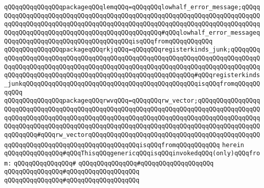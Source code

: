 \verb|qQQqqQQqqQQqqQQqpackageqQQqlemqQQq=qQQqqQQqlowhalf_error_message;qQQqqQQqqQQqqQQqqQQqqQQqqQQqqQQqqQQqqQQqqQQqqQQqqQQqqQQqqQQqqQQqqQQqqQQqqQQqqQQqqQQqqQQqqQQqqQQqqQQqqQQqqQQqqQQqqQQqqQQqqQQqqQQqqQQqqQQqqQQqqQQqqQQqqQQqqQQqqQQqqQQqqQQqqQQqqQQqqQQqqQQqqQQq#qQQqlowhalf_error_messageqQQqqQQqqQQqqQQqqQQqqQQqqQQqqQQqqQQqisqQQqfromqQQqqQQqqQQq|\newline
\verb|qQQqqQQqqQQqqQQqpackageqQQqrkjqQQq=qQQqqQQqregisterkinds_junk;qQQqqQQqqQQqqQQqqQQqqQQqqQQqqQQqqQQqqQQqqQQqqQQqqQQqqQQqqQQqqQQqqQQqqQQqqQQqqQQqqQQqqQQqqQQqqQQqqQQqqQQqqQQqqQQqqQQqqQQqqQQqqQQqqQQqqQQqqQQqqQQqqQQqqQQqqQQqqQQqqQQqqQQqqQQqqQQqqQQqqQQqqQQqqQQqqQQqqQQq#qQQqregisterkinds_junkqQQqqQQqqQQqqQQqqQQqqQQqqQQqqQQqqQQqqQQqqQQqqQQqisqQQqfromqQQqqQQqqQQq|\newline
\verb|qQQqqQQqqQQqqQQqpackageqQQqrwvqQQq=qQQqqQQqrw_vector;qQQqqQQqqQQqqQQqqQQqqQQqqQQqqQQqqQQqqQQqqQQqqQQqqQQqqQQqqQQqqQQqqQQqqQQqqQQqqQQqqQQqqQQqqQQqqQQqqQQqqQQqqQQqqQQqqQQqqQQqqQQqqQQqqQQqqQQqqQQqqQQqqQQqqQQqqQQqqQQqqQQqqQQqqQQqqQQqqQQqqQQqqQQqqQQqqQQqqQQqqQQqqQQqqQQqqQQqqQQqqQQqqQQqqQQqqQQq#qQQqrw_vectorqQQqqQQqqQQqqQQqqQQqqQQqqQQqqQQqqQQqqQQqqQQqqQQqqQQqqQQqqQQqqQQqqQQqqQQqqQQqqQQqqQQqisqQQqfromqQQqqQQqqQQq|\newline
\verb|herein|\newline
\newline
\verb|qQQqqQQqqQQqqQQq#qQQqThisqQQqgenericqQQqisqQQqinvokedqQQq(only)qQQqfrom:|\newline
\verb|qQQqqQQqqQQqqQQq#|\newline
\verb|qQQqqQQqqQQqqQQq#qQQqqQQqqQQqqQQqqQQq|\newline
\verb|qQQqqQQqqQQqqQQq#qQQqqQQqqQQqqQQqqQQq|\newline
\verb|qQQqqQQqqQQqqQQq#qQQqqQQqqQQqqQQqqQQq|\newline

